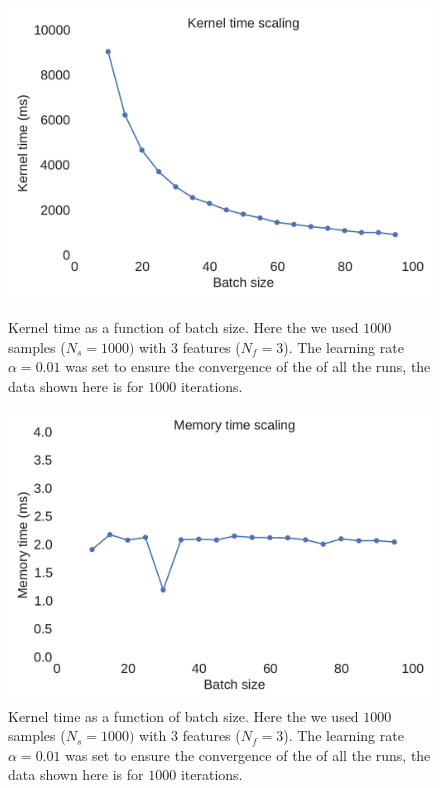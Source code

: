 \documentclass[11pt,a4paper]{article}
\begin{document}
\begin{figure}[H]
	\centering
  \includegraphics[width=\linewidth]{kernel_time_batch_scaling.pdf}
  \caption{Kernel time as a function of batch size. Here the we used $1000$ samples ($N_s=1000) $ with $3$ features ($N_f=3$). The learning rate $\alpha=0.01$ was set to ensure the convergence of the of all the runs, the data shown here is for $1000$ iterations.}
  \label{fig:test_batch_size_kernel}
\endminipage
\hfill
{}
  \includegraphics[width=\linewidth]{memory_time_batch_scaling.pdf}
  \caption{Kernel time as a function of batch size. Here the we used $1000$ samples ($N_s=1000) $ with $3$ features ($N_f=3$). The learning rate $\alpha=0.01$ was set to ensure the convergence of the of all the runs, the data shown here is for $1000$ iterations.}
  \label{fig:test_batch_size_memory}
\endminipage
\end{figure}
\end{document}

